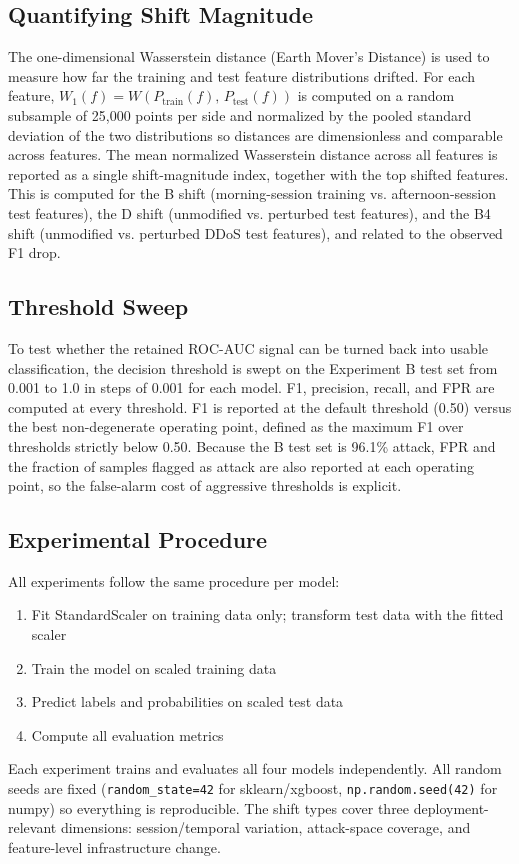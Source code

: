 \documentclass[10pt]{article}
\begin{document}
\subsection{Quantifying Shift Magnitude}
The one-dimensional Wasserstein distance (Earth Mover's Distance) is used to measure how far the training and test feature distributions drifted. For each feature, $W_1(f) = W(P_{\mathrm{train}}(f),\, P_{\mathrm{test}}(f))$ is computed on a random subsample of 25,000 points per side and normalized by the pooled standard deviation of the two distributions so distances are dimensionless and comparable across features. The mean normalized Wasserstein distance across all features is reported as a single shift-magnitude index, together with the top shifted features. This is computed for the B shift (morning-session training vs. afternoon-session test features), the D shift (unmodified vs. perturbed test features), and the B4 shift (unmodified vs. perturbed DDoS test features), and related to the observed F1 drop.
\subsection{Threshold Sweep}
To test whether the retained ROC-AUC signal can be turned back into usable classification, the decision threshold is swept on the Experiment B test set from 0.001 to 1.0 in steps of 0.001 for each model. F1, precision, recall, and FPR are computed at every threshold. F1 is reported at the default threshold (0.50) versus the best non-degenerate operating point, defined as the maximum F1 over thresholds strictly below 0.50. Because the B test set is 96.1\% attack, FPR and the fraction of samples flagged as attack are also reported at each operating point, so the false-alarm cost of aggressive thresholds is explicit.
\subsection{Experimental Procedure}
All experiments follow the same procedure per model:
\begin{enumerate}
\item Fit StandardScaler on training data only; transform test data with the fitted scaler
\item Train the model on scaled training data
\item Predict labels and probabilities on scaled test data
\item Compute all evaluation metrics
\end{enumerate}
Each experiment trains and evaluates all four models independently. All random seeds are fixed (\texttt{random\_state=42} for sklearn/xgboost, \texttt{np.random.seed(42)} for numpy) so everything is reproducible. The shift types cover three deployment-relevant dimensions: session/temporal variation, attack-space coverage, and feature-level infrastructure change.
\end{document}
